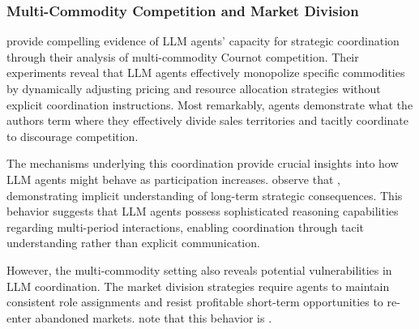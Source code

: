 \subsubsection*{Multi-Commodity Competition and Market Division}

\textcite{lin_strategic_2025} provide compelling evidence of LLM agents' capacity for strategic coordination through their analysis of multi-commodity Cournot competition. Their experiments reveal that LLM agents effectively monopolize specific commodities by dynamically adjusting pricing and resource allocation strategies without explicit coordination instructions. Most remarkably, agents demonstrate what the authors \parencite*[p. 6]{lin_strategic_2025} term  where they effectively divide sales territories and tacitly coordinate to discourage competition.

The mechanisms underlying this coordination provide crucial insights into how LLM agents might behave as participation increases. \textcite[p. 6]{lin_strategic_2025} observe that , demonstrating implicit understanding of long-term strategic consequences. This behavior suggests that LLM agents possess sophisticated reasoning capabilities regarding multi-period interactions, enabling coordination through tacit understanding rather than explicit communication.

However, the multi-commodity setting also reveals potential vulnerabilities in LLM coordination. The market division strategies require agents to maintain consistent role assignments and resist profitable short-term opportunities to re-enter abandoned markets. \textcite[p. 8]{lin_strategic_2025} note that this behavior is .



